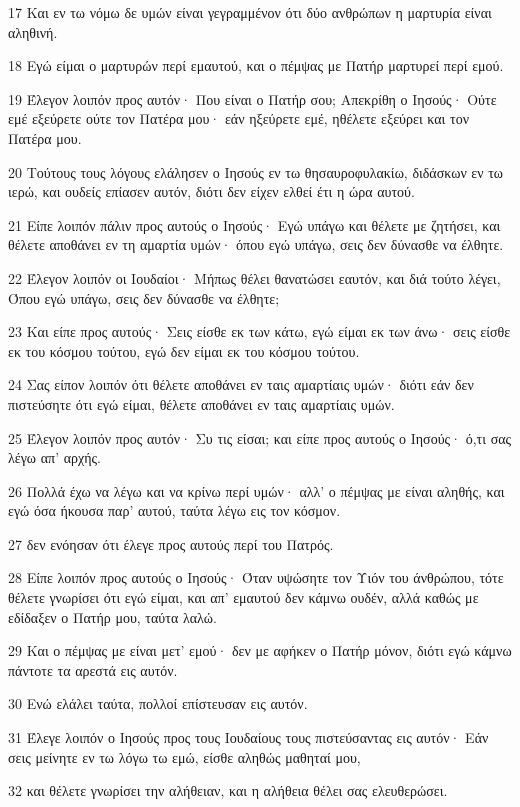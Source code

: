 \par 17 Και εν τω νόμω δε υμών είναι γεγραμμένον ότι δύο ανθρώπων η μαρτυρία είναι αληθινή.
\par 18 Εγώ είμαι ο μαρτυρών περί εμαυτού, και ο πέμψας με Πατήρ μαρτυρεί περί εμού.
\par 19 Έλεγον λοιπόν προς αυτόν· Που είναι ο Πατήρ σου; Απεκρίθη ο Ιησούς· Ούτε εμέ εξεύρετε ούτε τον Πατέρα μου· εάν ηξεύρετε εμέ, ηθέλετε εξεύρει και τον Πατέρα μου.
\par 20 Τούτους τους λόγους ελάλησεν ο Ιησούς εν τω θησαυροφυλακίω, διδάσκων εν τω ιερώ, και ουδείς επίασεν αυτόν, διότι δεν είχεν ελθεί έτι η ώρα αυτού.
\par 21 Είπε λοιπόν πάλιν προς αυτούς ο Ιησούς· Εγώ υπάγω και θέλετε με ζητήσει, και θέλετε αποθάνει εν τη αμαρτία υμών· όπου εγώ υπάγω, σεις δεν δύνασθε να έλθητε.
\par 22 Έλεγον λοιπόν οι Ιουδαίοι· Μήπως θέλει θανατώσει εαυτόν, και διά τούτο λέγει, Όπου εγώ υπάγω, σεις δεν δύνασθε να έλθητε;
\par 23 Και είπε προς αυτούς· Σεις είσθε εκ των κάτω, εγώ είμαι εκ των άνω· σεις είσθε εκ του κόσμου τούτου, εγώ δεν είμαι εκ του κόσμου τούτου.
\par 24 Σας είπον λοιπόν ότι θέλετε αποθάνει εν ταις αμαρτίαις υμών· διότι εάν δεν πιστεύσητε ότι εγώ είμαι, θέλετε αποθάνει εν ταις αμαρτίαις υμών.
\par 25 Έλεγον λοιπόν προς αυτόν· Συ τις είσαι; και είπε προς αυτούς ο Ιησούς· ό,τι σας λέγω απ' αρχής.
\par 26 Πολλά έχω να λέγω και να κρίνω περί υμών· αλλ' ο πέμψας με είναι αληθής, και εγώ όσα ήκουσα παρ' αυτού, ταύτα λέγω εις τον κόσμον.
\par 27 δεν ενόησαν ότι έλεγε προς αυτούς περί του Πατρός.
\par 28 Είπε λοιπόν προς αυτούς ο Ιησούς· Όταν υψώσητε τον Υιόν του άνθρώπου, τότε θέλετε γνωρίσει ότι εγώ είμαι, και απ' εμαυτού δεν κάμνω ουδέν, αλλά καθώς με εδίδαξεν ο Πατήρ μου, ταύτα λαλώ.
\par 29 Και ο πέμψας με είναι μετ' εμού· δεν με αφήκεν ο Πατήρ μόνον, διότι εγώ κάμνω πάντοτε τα αρεστά εις αυτόν.
\par 30 Ενώ ελάλει ταύτα, πολλοί επίστευσαν εις αυτόν.
\par 31 Έλεγε λοιπόν ο Ιησούς προς τους Ιουδαίους τους πιστεύσαντας εις αυτόν· Εάν σεις μείνητε εν τω λόγω τω εμώ, είσθε αληθώς μαθηταί μου,
\par 32 και θέλετε γνωρίσει την αλήθειαν, και η αλήθεια θέλει σας ελευθερώσει.
